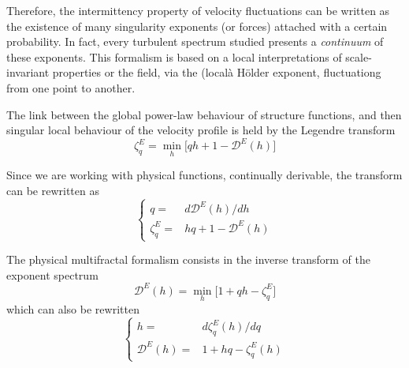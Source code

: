 Therefore, the intermittency property of velocity fluctuations can be written as the existence of many singularity exponents (or forces) attached with a certain probability. In fact, every turbulent spectrum studied presents a \emph{continuum} of these exponents. This formalism is based on a local interpretations of scale-invariant properties or the field, via the (localà Hölder exponent, fluctuationg from one point to another. 

The link between the global power-law behaviour of structure functions, and then singular local behaviour of the velocity profile is held by the Legendre transform
\begin{equation}
    \zeta_q^E=\min_h\big[qh+1-\mathcal{D}^E(h)\big]
\end{equation}

Since we are working with physical functions, continually derivable, the transform can be rewritten as
\begin{equation}
    \begin{cases}
    \displaystyle q=&d\mathcal{D}^E(h)/dh\\
    \displaystyle \zeta_q^E=&hq+1-\mathcal{D}^E(h)
    \end{cases}
\end{equation}

The physical multifractal formalism consists in the inverse transform of the exponent spectrum
\begin{equation}
    \mathcal{D}^E(h)=\min_h\big[1+qh-\zeta_q^E\big]
\end{equation}
which can also be rewritten
\begin{equation}
    \begin{cases}
    \displaystyle h=&d\zeta_q^E(h)/dq\\
    \displaystyle \mathcal{D}^E(h)=&1+hq-\zeta_q^E(h)
    \end{cases}
\end{equation}

